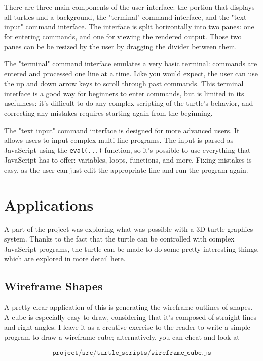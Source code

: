 \documentclass[12pt]{article}
\begin{document}
There are three main components of the user interface: the portion that displays all turtles and a background, the "terminal" command interface, and the "text input" command interface. The interface is split horizontally into two panes: one for entering commands, and one for viewing the rendered output. Those two panes can be be resized by the user by dragging the divider between them.

The "terminal" command interface emulates a very basic terminal: commands are entered and processed one line at a time. Like you would expect, the user can use the up and down arrow keys to scroll through past commands. This terminal interface is a good way for beginners to enter commands, but is limited in its usefulness: it's difficult to do any complex scripting of the turtle's behavior, and correcting any mistakes requires starting again from the beginning.

The "text input" command interface is designed for more advanced users. It allows users to input complex multi-line programs. The input is parsed as JavaScript using the \texttt{eval(...)} function, so it's possible to use everything that JavaScript has to offer: variables, loops, functions, and more. Fixing mistakes is easy, as the user can just edit the appropriate line and run the program again.

\section{Applications}

A part of the project was exploring what was possible with a 3D turtle graphics system. Thanks to the fact that the turtle can be controlled with complex JavaScript programs, the turtle can be made to do some pretty interesting things, which are explored in more detail here.

\subsection{Wireframe Shapes}

A pretty clear application of this is generating the wireframe outlines of shapes. A cube is especially easy to draw, considering that it's composed of straight lines and right angles. I leave it as a creative exercise to the reader to write a simple program to draw a wireframe cube; alternatively, you can cheat and look at

\[\texttt{project/src/turtle\_scripts/wireframe\_cube.js}\]
\end{document}
